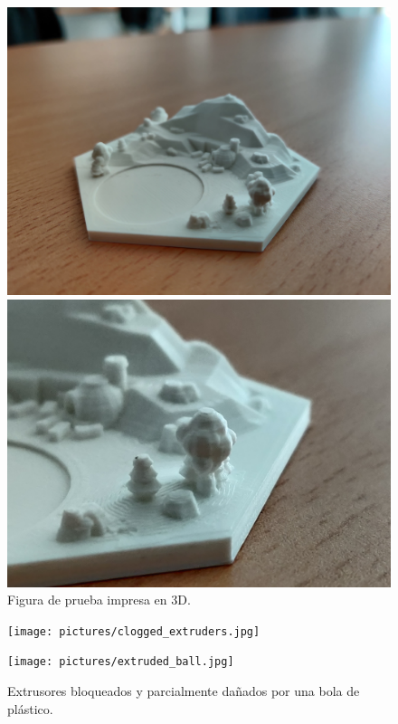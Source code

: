 \begin{figure}[H]
    \begin{minipage}{.48\linewidth}
        \centering
        \includegraphics[width=\linewidth]{pictures/3d_test.jpg}
    \end{minipage}
    \hfill
    \begin{minipage}{.48\linewidth}
        \centering
        \includegraphics[width=\linewidth]{pictures/3d_test_detail.jpg}
    \end{minipage}
    \caption{Figura de prueba impresa en 3D.}
    \label{fig:test_prints}
\end{figure}

\begin{figure}[H]
    \begin{minipage}{.48\linewidth}
        \centering
        \texttt{[image: pictures/clogged\_extruders.jpg]}
    \end{minipage}
    \hfill
    \begin{minipage}{.48\linewidth}
        \centering
        \texttt{[image: pictures/extruded\_ball.jpg]}
    \end{minipage}
    \caption{Extrusores bloqueados y parcialmente dañados por una bola de plástico.}
    \label{fig:3d_extruder_fail}
\end{figure}

